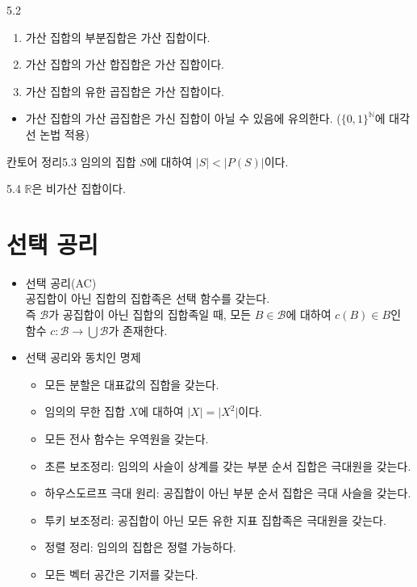 \documentclass{article}
\begin{document}
\begin{prop}{}{5.2}
    \begin{enumerate}[(1)]
        \item 가산 집합의 부분집합은 가산 집합이다.
        \item 가산 집합의 가산 합집합은 가산 집합이다.
        \item 가산 집합의 유한 곱집합은 가산 집합이다.
    \end{enumerate}
\end{prop}

\begin{itemize}
    \item[$\blacktriangleright$] 가산 집합의 가산 곱집합은 가신 집합이 아닐 수 있음에 유의한다. ($\{0,1\}^{\mathbb N}$에 대각선 논법 적용)
\end{itemize}

\begin{thm}{칸토어 정리}{5.3}
    임의의 집합 $S$에 대하여 $\vert S\vert<\vert P(S)\vert$이다.
\end{thm}

\begin{thm}{}{5.4}
    $\mathbb R$은 비가산 집합이다.
\end{thm}

\section{선택 공리}
\begin{itemize}
    \item 선택 공리(AC) \\
        공집합이 아닌 집합의 집합족은 선택 함수를 갖는다. \\
        즉 $\mathcal B$가 공집합이 아닌 집합의 집합족일 때, 모든 $B\in\mathcal B$에 대하여 $c(B)\in B$인 함수 $c:\mathcal B\to\bigcup\mathcal B$가 존재한다.
\end{itemize}

\begin{itemize}
    \item[$\bigstar$] 선택 공리와 동치인 명제
        \begin{itemize}
            \item[\checkmark] 모든 분할은 대표값의 집합을 갖는다.
            \item[\checkmark] 임의의 무한 집합 $X$에 대하여 $\vert X\vert=\vert X^2\vert$이다.
            \item[\checkmark] 모든 전사 함수는 우역원을 갖는다.
            \item[\checkmark] 초른 보조정리: 임의의 사슬이 상계를 갖는 부분 순서 집합은 극대원을 갖는다.
            \item[\checkmark] 하우스도르프 극대 원리: 공집합이 아닌 부분 순서 집합은 극대 사슬을 갖는다.
            \item[\checkmark] 투키 보조정리: 공집합이 아닌 모든 유한 지표 집합족은 극대원을 갖는다.
            \item[\checkmark] 정렬 정리: 임의의 집합은 정렬 가능하다.
            \item[\checkmark] 모든 벡터 공간은 기저를 갖는다.
        \end{itemize}
\end{itemize}
\end{document}
